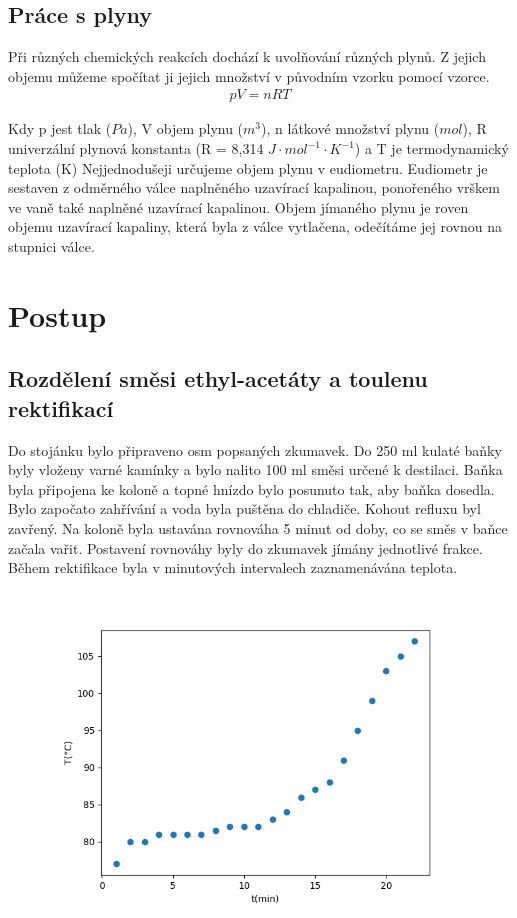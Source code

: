 \documentclass[13pt, a4paper, twoside]{article}
\begin{document}
\subsection*{Práce s plyny}
Při různých chemických reakcích dochází k uvolňování různých plynů. Z jejich objemu můžeme spočítat ji jejich množství v původním vzorku pomocí vzorce.
\begin{align*}
    pV=nRT
\end{align*}

Kdy p jest tlak ($Pa$), V objem plynu ($m^3$), n látkové množství plynu ($mol$), R univerzální plynová konstanta  (R = 8,314 $J\cdot mol^{-1}\cdot K^{-1}$) a T je termodynamický teplota (K)
Nejjednodušeji určujeme objem plynu v eudiometru. Eudiometr je sestaven z odměrného válce naplněného uzavírací kapalinou, ponořeného vrškem ve vaně také naplněné uzavírací kapalinou. Objem jímaného plynu je roven objemu uzavírací kapaliny, která byla z válce vytlačena, odečítáme jej rovnou na stupnici válce.

\section*{Postup}
\subsection*{Rozdělení směsi ethyl-acetáty a toulenu rektifikací}
Do stojánku bylo připraveno osm popsaných zkumavek. Do 250 ml kulaté baňky byly vloženy varné kamínky a bylo nalito 100 ml směsi určené k destilaci. Baňka byla připojena ke koloně a topné hnízdo bylo posunuto tak, aby baňka dosedla. Bylo započato zahřívání a voda byla puštěna do chladiče. Kohout refluxu byl zavřený. Na koloně byla ustavána rovnováha 5 minut od doby, co se směs v baňce začala vařit.
Postavení rovnováhy byly do zkumavek jímány jednotlivé frakce. Během rektifikace byla v minutových intervalech zaznamenávána teplota.

\begin{figure}[H]
    \centering
    \includegraphics[width=6in]{teplota_cas.png}
\end{figure}
\end{document}
